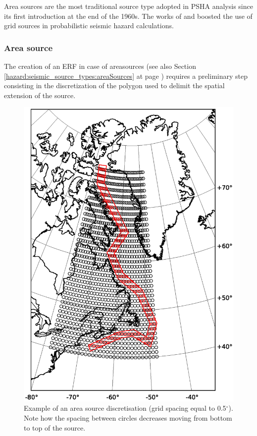 Area sources are the most traditional source type adopted in PSHA 
analysis since its first introduction at the end of the 1960s. 
%
The works of \cite{frankel1995} and \cite{frankel1997} boosted the 
use of grid sources in probabilistic seismic hazard calculations. 
%
\subsubsection{Area source}
\label{sec:areasource}
%
The creation of an ERF in case of \glspl{areasource} (see also Section 
\ref{hazard:seismic_source_types:areaSources} at page 
\pageref{hazard:seismic_source_types:areaSources}) requires a 
preliminary step consisting in the discretization of the polygon 
used to delimit the spatial extension of the source. 
%
\begin{figure}[!ht]
\centering
\includegraphics[width=18cm]{./Figures/Part_Hazard/area_source_discretization.eps}
\caption{Example of an area source discretisation (grid spacing equal 
to 0.5$^\circ$). Note how the spacing between circles decreases moving from 
bottom to top of the source.}
\label{fig:area_source_discret}
\end{figure}
